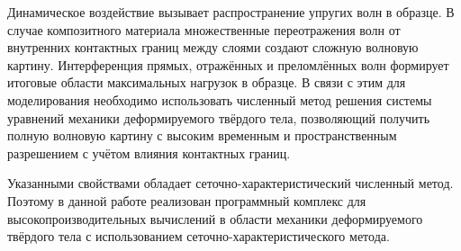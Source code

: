 Динамическое воздействие вызывает распространение упругих волн в образце. В случае 
композитного материала множественные переотражения волн от внутренних контактных 
границ между слоями создают сложную волновую картину. Интерференция прямых, отражённых 
и преломлённых волн формирует итоговые области максимальных нагрузок в образце. В связи
с этим для моделирования необходимо использовать численный метод решения системы 
уравнений механики деформируемого твёрдого тела, позволяющий получить полную волновую 
картину с высоким временным и пространственным разрешением с учётом влияния контактных 
границ.

Указанными свойствами обладает сеточно-характеристический численный метод. Поэтому 
в данной работе реализован программный комплекс для высокопроизводительных вычислений 
в области механики деформируемого твёрдого тела с использованием сеточно-характеристического 
метода.
